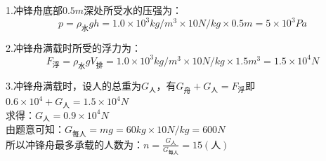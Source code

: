 \documentclass[12pt,twoside]{exam}
\begin{document}
\begin{Aquestions}
\begin{questions}
\begin{solution}[26ex]
1.冲锋舟底部$0.5m$深处所受水的压强为：
\[p=\rho _\textrm{水} g h =1.0\times 10^3 kg/m^3 \times 10N/kg \times 0.5m = 5 \times 10^3 Pa\]

2.冲锋舟满载时所受的浮力为：
\[F_\textrm{浮}=\rho _\textrm{水} g V_ \textrm{排} = 1.0\times 10^3 kg/m^3  \times 10N/kg \times 1.5m^3=1.5 \times 10^4 N \]

3.冲锋舟满载时，设人的总重为$G_\textrm{人}$，有$G_\textrm{舟}+G_\textrm{人}=F_\textrm{浮}$即$0.6 \times 10^4 +G_\textrm{人}  =1.5 \times 10 ^4 N$ \\
求得：$G_\textrm{人}=0.9\times 10^4 N$\\
由题意可知：$G_\textrm{每人}=mg=60kg\times 10 N/kg=600N$\\
所以冲锋舟最多承载的人数为：$n=\frac{G_\textrm{人}}{G_\textrm{每人}}=15(\textrm{人})$
\end{solution}


\end{questions}
\end{Aquestions}




\end{document}
